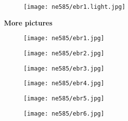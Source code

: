 \documentclass[aspectratio=1610,pdftex,dvipsnames,compress,xcolor={dvipsnames}]{beamer}
\begin{document}
\begin{frame}{}
    \begin{figure}
        \centering
        \texttt{[image: ne585/ebr1.light.jpg]}
    \end{figure}
\end{frame}


\begin{frame}[plain]{}
    \centering\LARGE\textbf{More pictures}
\end{frame}


\addtocounter{framenumber}{-1} 
\begin{frame}{}
    \begin{figure}
        \centering
        \texttt{[image: ne585/ebr1.jpg]}
    \end{figure}
\end{frame}


\begin{frame}{}
    \begin{figure}
        \centering
        \texttt{[image: ne585/ebr2.jpg]}
    \end{figure}
\end{frame}


\begin{frame}{}
    \begin{figure}
        \centering
        \texttt{[image: ne585/ebr3.jpg]}
    \end{figure}
\end{frame}


\begin{frame}{}
    \begin{figure}
        \centering
        \texttt{[image: ne585/ebr4.jpg]}
    \end{figure}
\end{frame}


\begin{frame}{}
    \begin{figure}
        \centering
        \texttt{[image: ne585/ebr5.jpg]}
    \end{figure}
\end{frame}


\begin{frame}{}
    \begin{figure}
        \centering
        \texttt{[image: ne585/ebr6.jpg]}
    \end{figure}
\end{frame}
\end{document}
